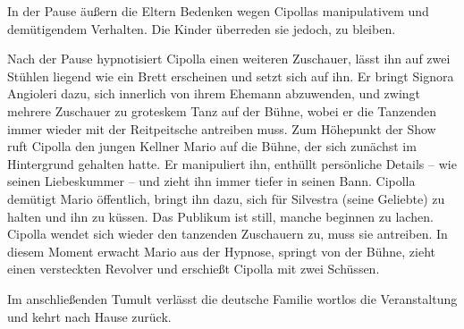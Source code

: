 {In der Pause äußern die Eltern Bedenken wegen Cipollas manipulativem und demütigendem Verhalten. Die Kinder überreden sie jedoch, zu bleiben.

Nach der Pause hypnotisiert Cipolla einen weiteren Zuschauer, lässt ihn auf zwei Stühlen liegend wie ein Brett erscheinen und setzt sich auf ihn. Er bringt Signora Angioleri dazu, sich innerlich von ihrem Ehemann abzuwenden, und zwingt mehrere Zuschauer zu groteskem Tanz auf der Bühne, wobei er die Tanzenden immer wieder mit der Reitpeitsche antreiben muss. 
Zum Höhepunkt der Show ruft Cipolla den jungen Kellner Mario auf die Bühne, der sich zunächst im Hintergrund gehalten hatte. Er manipuliert ihn, enthüllt persönliche Details – wie seinen Liebeskummer – und zieht ihn immer tiefer in seinen Bann. Cipolla demütigt Mario öffentlich, bringt ihn dazu, sich für Silvestra (seine Geliebte) zu halten und ihn zu küssen. Das Publikum ist still, manche beginnen zu lachen. Cipolla wendet sich wieder den tanzenden Zuschauern zu, muss sie antreiben. In diesem Moment erwacht Mario aus der Hypnose, springt von der Bühne, zieht einen versteckten Revolver und erschießt Cipolla mit zwei Schüssen.

Im anschließenden Tumult verlässt die deutsche Familie wortlos die Veranstaltung und kehrt nach Hause zurück.
}

